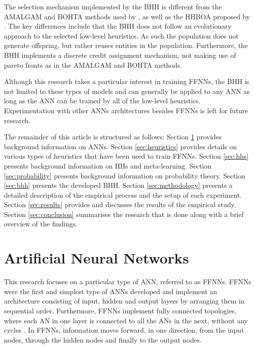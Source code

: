 \documentclass[preprint,review,12pt]{elsarticle}
\begin{document}
The selection mechanism implemented by the \acs{BHH} is different from the \acf{AMALGAM} and \acf{BOHTA} methods used by \citet{ref:nel:2021}, as well as the \acf{HHBOA} proposed by \citet{ref:oliva:2019}. The key differences include that the \acs{BHH} does not follow an evolutionary approach to the selected low-level heuristics. As such the population does not generate offspring, but rather reuses entities in the population. Furthermore, the \acs{BHH} implements a discrete credit assignment mechanism, not making use of pareto fronts as in the \acs{AMALGAM} and \acs{BOHTA} methods.

Although this research takes a particular interest in training \acp{FFNN}, the \acs{BHH} is not limited to these types of models and can generally be applied to any \acs{ANN} as long as the \acs{ANN} can be trained by all of the low-level heuristics. Experimentation with other \acp{ANN} architectures besides \acp{FFNN} is left for future research.

The remainder of this article is structured as follows: Section \ref{sec:anns} provides background information on \acp{ANN}. Section \ref{sec:heuristics} provides details on various types of heuristics that have been used to train \acp{FFNN}. Section \ref{sec:hhs} presents background information on \acp{HH} and meta-learning. Section \ref{sec:probability} presents background information on probability theory. Section \ref{sec:bhh} presents the developed \acs{BHH}. Section \ref{sec:methodology} presents a detailed description of the empirical process and the setup of each experiment. Section \ref{sec:results} provides and discusses the results of the empirical study. Section \ref{sec:conclusion} summarises the research that is done along with a brief overview of the findings.

\section{Artificial Neural Networks}
\label{sec:anns}

This research focuses on a particular type of \acs{ANN}, referred to as \acfp{FFNN}. \acp{FFNN} were the first and simplest type of \acp{ANN} developed \citep{ref:schmidhuber:2015} and implement an architecture consisting of input, hidden and output layers by arranging them in sequential order. Furthermore, \acp{FFNN} implement fully connected topologies, where each \acf{AN} in one layer is connected to all the \acp{AN} in the next, without any cycles \citep{ref:zell:1994}. In \acp{FFNN}, information moves forward, in one direction, from the input nodes, through the hidden nodes and finally to the output nodes.
\end{document}
